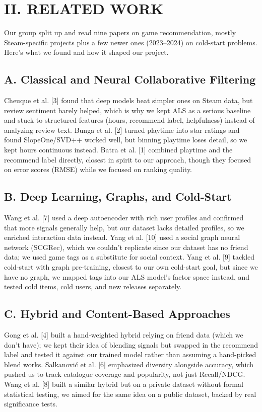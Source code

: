 \documentclass[conference]{IEEEtran}
\begin{document}
\section*{II. RELATED WORK}

Our group split up and read nine papers on game recommendation, mostly Steam-specific projects plus a few newer ones (2023--2024) on cold-start problems. Here's what we found and how it shaped our project.

\subsection*{A. Classical and Neural Collaborative Filtering}

Cheuque et al. [3] found that deep models beat simpler ones on Steam data, but review sentiment barely helped, which is why we kept ALS as a serious baseline and stuck to structured features (hours, recommend label, helpfulness) instead of analyzing review text. Bunga et al. [2] turned playtime into star ratings and found SlopeOne/SVD++ worked well, but binning playtime loses detail, so we kept hours continuous instead. Batra et al. [1] combined playtime and the recommend label directly, closest in spirit to our approach, though they focused on error scores (RMSE) while we focused on ranking quality.

\subsection*{B. Deep Learning, Graphs, and Cold-Start}

Wang et al. [7] used a deep autoencoder with rich user profiles and confirmed that more signals generally help, but our dataset lacks detailed profiles, so we enriched interaction data instead. Yang et al. [10] used a social graph neural network (SCGRec), which we couldn't replicate since our dataset has no friend data; we used game tags as a substitute for social context. Yang et al. [9] tackled cold-start with graph pre-training, closest to our own cold-start goal, but since we have no graph, we mapped tags into our ALS model's factor space instead, and tested cold items, cold users, and new releases separately.

\subsection*{C. Hybrid and Content-Based Approaches}

Gong et al. [4] built a hand-weighted hybrid relying on friend data (which we don't have); we kept their idea of blending signals but swapped in the recommend label and tested it against our trained model rather than assuming a hand-picked blend works. Salkanović et al. [6] emphasized diversity alongside accuracy, which pushed us to track catalogue coverage and popularity, not just Recall/NDCG. Wang et al. [8] built a similar hybrid but on a private dataset without formal statistical testing, we aimed for the same idea on a public dataset, backed by real significance tests.
\end{document}

